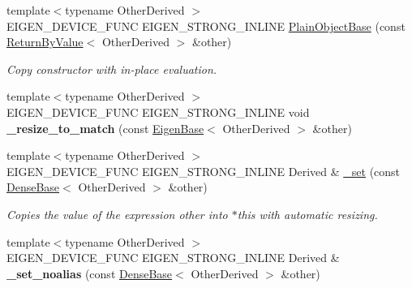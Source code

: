 \begin{DoxyCompactItemize}
\item 
\mbox{\label{class_eigen_1_1_plain_object_base_abb80b2ee27de8b5d7ef2c8fb403c0068}} 
{\footnotesize template$<$typename Other\+Derived $>$ }\\E\+I\+G\+E\+N\+\_\+\+D\+E\+V\+I\+C\+E\+\_\+\+F\+U\+NC E\+I\+G\+E\+N\+\_\+\+S\+T\+R\+O\+N\+G\+\_\+\+I\+N\+L\+I\+NE \hyperlink{class_eigen_1_1_plain_object_base_abb80b2ee27de8b5d7ef2c8fb403c0068}{Plain\+Object\+Base} (const \hyperlink{group___core___module_class_eigen_1_1_return_by_value}{Return\+By\+Value}$<$ Other\+Derived $>$ \&other)
\begin{DoxyCompactList}\small\item\em Copy constructor with in-\/place evaluation. \end{DoxyCompactList}\item 
\mbox{\label{class_eigen_1_1_plain_object_base_ac61a071ebfe1068ff76095b617a35e93}} 
{\footnotesize template$<$typename Other\+Derived $>$ }\\E\+I\+G\+E\+N\+\_\+\+D\+E\+V\+I\+C\+E\+\_\+\+F\+U\+NC E\+I\+G\+E\+N\+\_\+\+S\+T\+R\+O\+N\+G\+\_\+\+I\+N\+L\+I\+NE void {\bfseries \+\_\+resize\+\_\+to\+\_\+match} (const \hyperlink{group___core___module_struct_eigen_1_1_eigen_base}{Eigen\+Base}$<$ Other\+Derived $>$ \&other)
\item 
{\footnotesize template$<$typename Other\+Derived $>$ }\\E\+I\+G\+E\+N\+\_\+\+D\+E\+V\+I\+C\+E\+\_\+\+F\+U\+NC E\+I\+G\+E\+N\+\_\+\+S\+T\+R\+O\+N\+G\+\_\+\+I\+N\+L\+I\+NE Derived \& \hyperlink{class_eigen_1_1_plain_object_base_aa77dab5e9e6ba9e39740e17cfae78a33}{\+\_\+set} (const \hyperlink{group___core___module_class_eigen_1_1_dense_base}{Dense\+Base}$<$ Other\+Derived $>$ \&other)
\begin{DoxyCompactList}\small\item\em Copies the value of the expression {\itshape other} into {\ttfamily $\ast$this} with automatic resizing. \end{DoxyCompactList}\item 
\mbox{\label{class_eigen_1_1_plain_object_base_a28cdcf06eb94c404cd327a5b7b806789}} 
{\footnotesize template$<$typename Other\+Derived $>$ }\\E\+I\+G\+E\+N\+\_\+\+D\+E\+V\+I\+C\+E\+\_\+\+F\+U\+NC E\+I\+G\+E\+N\+\_\+\+S\+T\+R\+O\+N\+G\+\_\+\+I\+N\+L\+I\+NE Derived \& {\bfseries \+\_\+set\+\_\+noalias} (const \hyperlink{group___core___module_class_eigen_1_1_dense_base}{Dense\+Base}$<$ Other\+Derived $>$ \&other)

\end{DoxyCompactItemize}
